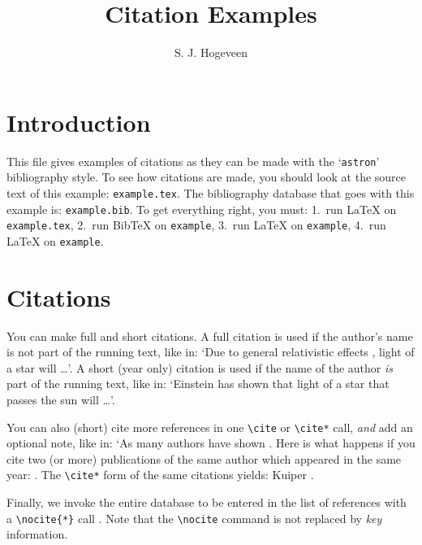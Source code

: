 
\title{Citation Examples}
\author{S. J. Hogeveen}


\maketitle

\section*{Introduction}

This file gives examples of citations as they can be made with the
`{\tt astron}' bibliography style.
To see how citations are made, you should look at the source text of
this example: {\tt example.tex}.
The bibliography database that goes with this example is: {\tt example.bib}.
To get everything right, you must: 1.~run LaTeX on {\tt example.tex},
2.~run BibTeX on {\tt example}, 3.~run LaTeX on {\tt example},
4.~run LaTeX on {\tt example}.

\section*{Citations}

You can make full and short citations.
A full citation is used if the author's name is not part of the running text,
like in: `Due to general relativistic effects \cite{einstein}, light of a
star will \ldots'.
A short (year only) citation is used if the name of the author {\sl is\/} part
of the running text, like in: `Einstein \cite*{einstein} has shown that
light of a star that passes the sun will \ldots'.

You can also (short) cite more references in one \verb|\cite| or \verb|\cite*|
call, {\sl and\/} add an optional note, like in: `As many authors have shown
\cite[but not necessarily in this order]{einstein,burkhardt,chandrasekhar,%
pannekoek,pringle:ibs}.
Here is what happens if you cite two (or more) publications of the same author
which appeared in the same year: \cite{kuip:ds1,kuip:ds2}.
The \verb|\cite*| form of the same citations yields: Kuiper
\cite*{kuip:ds1,kuip:ds2}.

Finally, we invoke the entire database to be entered in the list of references
with a \verb|\nocite{*}| call \nocite{*}.
Note that the \verb|\nocite| command is not replaced by {\it key\/}
information.







